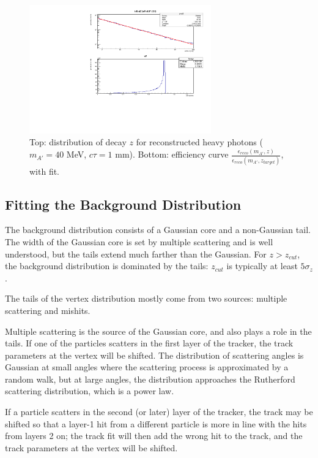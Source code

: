 \begin{figure}[ht]
\begin{center}
    \includegraphics[width=0.7\textwidth,page=2,angle=-90]{vertexing/figs/acceptance_40}
\end{center}
    \caption{Top: distribution of decay $z$ for reconstructed heavy photons ($m_{A'}=40$ MeV, $c\tau=1$ mm). Bottom: efficiency curve $\frac{\epsilon_{reco}(m_{A'},z)}{\epsilon_{reco}(m_{A'},z_{target})}$, with fit.}
    \label{fig:eff_z}
\end{figure}

\subsection{Fitting the Background Distribution}
\label{sec:tails}
The background distribution consists of a Gaussian core and a non-Gaussian tail.
The width of the Gaussian core is set by multiple scattering and is well understood, but the tails extend much farther than the Gaussian.
For $z>z_{cut}$, the background distribution is dominated by the tails: $z_{cut}$ is typically at least $5\sigma_z$.

The tails of the vertex distribution mostly come from two sources: multiple scattering and mishits.

Multiple scattering is the source of the Gaussian core, and also plays a role in the tails.
If one of the particles scatters in the first layer of the tracker, the track parameters at the vertex will be shifted.
The distribution of scattering angles is Gaussian at small angles where the scattering process is approximated by a random walk, but at large angles, the distribution approaches the Rutherford scattering distribution, which is a power law.

If a particle scatters in the second (or later) layer of the tracker, the track may be shifted so that a layer-1 hit from a different particle is more in line with the hits from layers 2 on; the track fit will then add the wrong hit to the track, and the track parameters at the vertex will be shifted.

